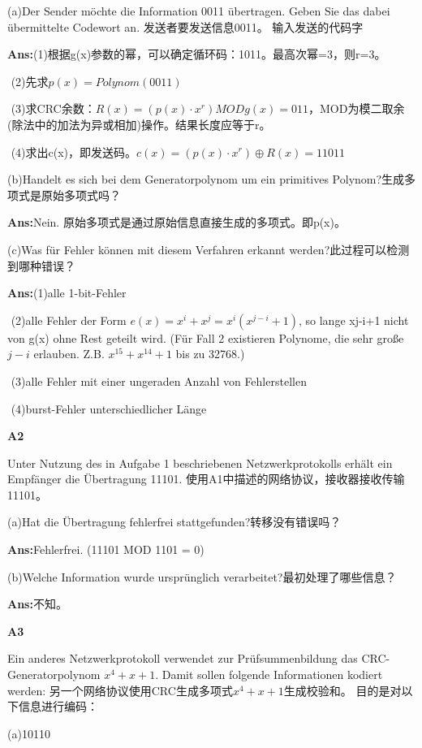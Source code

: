 \documentclass[fleqn]{article}
\begin{document}
(a)Der Sender möchte die Information 0011 übertragen. Geben Sie das dabei übermittelte Codewort an. 
发送者要发送信息0011。 输入发送的代码字

\textbf{Ans:}(1)根据g(x)参数的幂，可以确定循环码：1011。最高次幂=3，则r=3。

\quad \quad \,\,(2)先求$p(x)=Polynom(0011)$

\quad \quad \,\,(3)求CRC余数：$R(x)=(p(x)\cdot x^r) MOD g(x) = 011$，MOD为模二取余(除法中的加法为异或相加)操作。结果长度应等于r。

\quad \quad \,\,(4)求出c(x)，即发送码。$c(x)=(p(x)\cdot x^r)\oplus R(x)=11011$

(b)Handelt es sich bei dem Generatorpolynom um ein primitives Polynom?生成多项式是原始多项式吗？

\textbf{Ans:}Nein. 原始多项式是通过原始信息直接生成的多项式。即p(x)。

(c)Was für Fehler können mit diesem Verfahren erkannt werden?此过程可以检测到哪种错误？

\textbf{Ans:}(1)alle 1-bit-Fehler 

\quad \quad \,\,(2)alle Fehler der Form $e(x) = x^i + x^j = x^i(x^{j-i}+1)$, so lange xj-i+1 nicht von g(x) ohne Rest geteilt wird.
(Für Fall 2 existieren Polynome, die sehr große $j-i$ erlauben. Z.B. $x^{15}+x^{14}+1$ bis zu 32768.)


\quad \quad \,\,(3)alle Fehler mit einer ungeraden Anzahl von Fehlerstellen

\quad \quad \,\,(4)burst-Fehler unterschiedlicher Länge


\noindent\textbf{A2}

Unter Nutzung des in Aufgabe 1 beschriebenen Netzwerkprotokolls erhält ein Empfänger die Übertragung 11101.
使用A1中描述的网络协议，接收器接收传输11101。

(a)Hat die Übertragung fehlerfrei stattgefunden?转移没有错误吗？

\textbf{Ans:}Fehlerfrei. (11101 MOD 1101 = 0)

(b)Welche Information wurde ursprünglich verarbeitet?最初处理了哪些信息？

\textbf{Ans:}不知。

\noindent\textbf{A3}

Ein anderes Netzwerkprotokoll verwendet zur Prüfsummenbildung das CRC-Generatorpolynom $x^4+x+1$. Damit sollen folgende Informationen kodiert werden:
另一个网络协议使用CRC生成多项式$ x ^ 4 + x + 1 $生成校验和。 目的是对以下信息进行编码：

(a)10110
\end{document}
